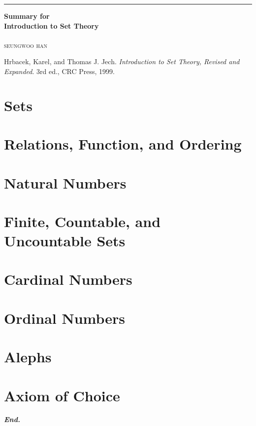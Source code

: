 \documentclass[a4paper,12pt]{report}
\begin{document}
\begin{titlepage}
	\raggedleft

	\rule{1pt}{\textheight}
	\hspace{0.05\textwidth}
	\parbox[b]{0.75\textwidth}{

		{\Huge\bfseries Summary for\\[0.5\baselineskip] Introduction to Set Theory}\\[2\baselineskip]
		\\[4\baselineskip]
		{\Large\textsc{seungwoo han}}

		\vspace{0.5\textheight} %

        {\noindent
        Hrbacek, Karel, and Thomas J. Jech.
        \textit{Introduction to Set Theory, Revised and Expanded}. 3rd ed.,
        CRC Press, 1999.}\\[\baselineskip]
	}
\end{titlepage}
\tikzexternaldisable
\tableofcontents
\tikzexternalenable
\hypersetup{
    colorlinks=true,
    linkcolor=red!50!black,
    filecolor=black,
    urlcolor=red!50!black,
}
\pagebreak

\chapter{Sets}\label{chap:sets}

\chapter{Relations, Function, and Ordering}\label{chap:relFuncOrder}



\chapter{Natural Numbers}\label{chap:nat}




\chapter{Finite, Countable, and Uncountable Sets}\label{chap:finite}




\chapter{Cardinal Numbers}\label{chap:cardinal}
\chapter{Ordinal Numbers}\label{chap:ordinal}
\chapter{Alephs}\label{chap:aleph}
\chapter{Axiom of Choice}\label{chap:aoc}

\vfill
\begin{center}
    \textbf{\textit{End.}}
\end{center}
\end{document}
